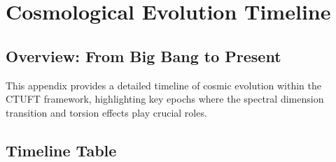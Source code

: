 \appendix
\section{Cosmological Evolution Timeline}
\label{app:cosmic_timeline}

\subsection{Overview: From Big Bang to Present}

This appendix provides a detailed timeline of cosmic evolution within the CTUFT framework, highlighting key epochs where the spectral dimension transition and torsion effects play crucial roles.

\subsection{Timeline Table}

